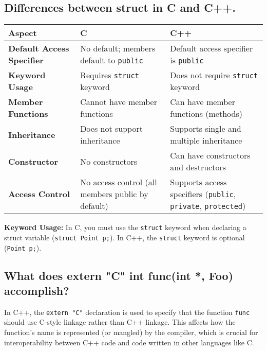 \subsection{Differences between struct in C and C++.}
\begin{tabularx}{\textwidth}{|p{2.5cm}|X|X|}
    \hline \rowcolor{tableheader}
    \textbf{Aspect}                 & \textbf{C}                                      & \textbf{C++}                                             \\
    \hline
    \textbf{Default Access Specifier} & No default; members default to \texttt{public} & Default access specifier is \texttt{public}                 \\
    \hline
    \textbf{Keyword Usage}           & Requires \texttt{struct} keyword               & Does not require \texttt{struct} keyword                   \\
    \hline
    \textbf{Member Functions}        & Cannot have member functions                  & Can have member functions (methods)                         \\
    \hline
    \textbf{Inheritance}             & Does not support inheritance                 & Supports single and multiple inheritance                    \\
    \hline
    \textbf{Constructor}             & No constructors                               & Can have constructors and destructors                       \\
    \hline
    \textbf{Access Control}          & No access control (all members public by default) & Supports access specifiers (\texttt{public}, \texttt{private}, \texttt{protected}) \\
    \hline
\end{tabularx}
\begin{tcolorbox}[arc=5pt, boxrule=2pt, title=Notes]
\textbf{Keyword Usage:} In C, you must use the \texttt{struct} keyword when declaring a struct variable (\texttt{struct Point p;}). In C++, the \texttt{struct} keyword is optional (\texttt{Point p;}).
\end{tcolorbox}

\subsection{What does extern "C" int func(int *, Foo) accomplish?}
In C++, the \texttt{extern "C"} declaration is used to specify that the function \texttt{func} should use C-style linkage rather than C++ linkage. This affects how the function's name is represented (or mangled) by the compiler, which is crucial for interoperability between C++ code and code written in other languages like C.

